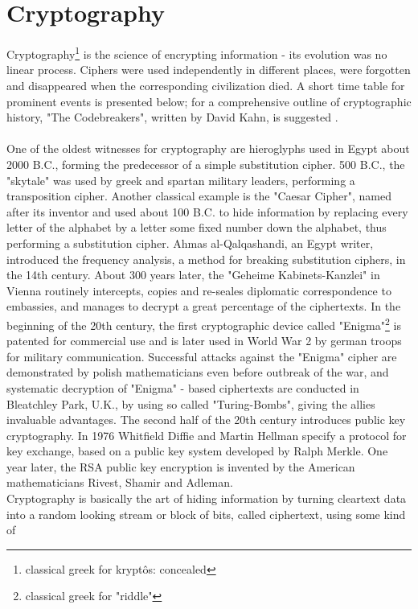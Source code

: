 \section{Cryptography}\label{sec:crypto}
Cryptography\footnote{classical greek for krypt\^{o}s: concealed}
is the science of encrypting information - its evolution was no linear process. Ciphers were used independently in different
places, were forgotten and disappeared when the corresponding civilization died.
A short time table for prominent events is presented below; for a comprehensive outline of cryptographic history, "The Codebreakers", written by David Kahn,
is suggested \cite{codebreakers}.
\\
\\
One of the oldest witnesses for cryptography are hieroglyphs used in Egypt about 2000 B.C., forming the predecessor
of a simple substitution cipher. 500 B.C., the "skytale" was used by greek and spartan military leaders, performing a transposition cipher. Another classical
example is the "Caesar Cipher", named after its inventor and used about 100 B.C. to hide information by replacing every letter of the alphabet by a letter some fixed number down the alphabet,
thus performing a substitution cipher. Ahmas al-Qalqashandi, an Egypt writer, introduced the frequency analysis, a method for breaking substitution ciphers,
in the 14th century. About 300 years later, the "Geheime Kabinets-Kanzlei" in Vienna routinely intercepts, copies and 
 re-seales diplomatic correspondence to embassies, and manages to decrypt a great percentage of the ciphertexts. In the beginning of the 20th century, the 
 first cryptographic device called "Enigma"\footnote{classical greek for "riddle"} is patented for commercial use and is later used in World War 2 by german troops for 
 military communication. Successful attacks against the "Enigma" cipher are demonstrated by polish mathematicians even before outbreak of the war, and systematic
 decryption of "Enigma" - based ciphertexts are conducted in Bleatchley Park, U.K., by using so called "Turing-Bombs", giving the allies invaluable advantages.
The second half of the 20th century introduces public key cryptography. In 1976 Whitfield Diffie and Martin Hellman specify a 
protocol for key exchange, based on a public key system developed by Ralph Merkle. One year later, the RSA public key encryption is invented by the American
mathematicians Rivest, Shamir and Adleman.
\\
Cryptography is basically the art of hiding information by turning cleartext
data into a random looking stream or block of bits, called ciphertext, using some kind of
